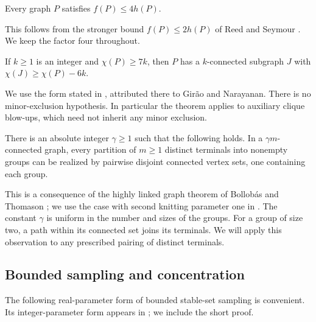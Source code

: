\begin{theorem}\label{thm:fractional}
Every graph $P$ satisfies $f(P)\le4h(P)$.
\end{theorem}
This follows from the stronger bound $f(P)\le2h(P)$ of Reed and Seymour
\cite[Statement~(1.3)]{ReedSeymour1998}. We keep the factor four throughout.

\begin{theorem}
\label{thm:ordinary-extraction}
If $k\ge1$ is an integer and $\chi(P)\ge7k$, then $P$ has a
$k$-connected subgraph $J$ with $\chi(J)\ge\chi(P)-6k$.
\end{theorem}
We use the form stated in \cite[Theorem~5.1]{DelcourtPostle2021},
attributed there to Gir\~ao and Narayanan. There is no minor-exclusion
hypothesis. In particular the theorem applies to auxiliary clique
blow-ups, which need not inherit any minor exclusion.

\begin{theorem}\label{thm:grouping}
There is an absolute integer $\gamma\ge1$ such that the following holds.
In a $\gamma m$-connected graph, every partition of $m\ge1$ distinct
terminals into nonempty groups can be realized by pairwise disjoint
connected vertex sets, one containing each group.
\end{theorem}
This is a consequence of the highly linked graph theorem of
Bollob\'as and Thomason \cite{BollobasThomason1996}; we use the
case with second knitting parameter one in
\cite[Definition~5.7 and Theorem~5.8]{DelcourtPostle2021}. The constant
$\gamma$ is uniform in the number and sizes of the groups. For a group
of size two, a path within its connected set joins its terminals. We
will apply this observation to any prescribed pairing of distinct
terminals.

\subsection{Bounded sampling and concentration}

The following real-parameter form of bounded stable-set sampling is
convenient. Its integer-parameter form appears in
\cite[Lemma~4.1]{LiuLuo2026}; we include the short proof.

